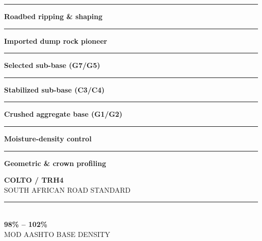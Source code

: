 \begin{minipage}[t]{0.34\textwidth}
    \vspace{0pt}
    \begin{tcolorbox}[
        enhanced, colback=mhoffwhite, colframe=mhnavy, boxrule=1pt, arc=4pt,
        title={\bfseries\color{white}\faRoad\ Layerworks Scope of Work},
        colbacktitle=mhnavy, left=7pt, right=7pt, top=6pt, bottom=6pt,
        drop shadow=black!6
    ]
        \fontsize{8.1pt}{11.6pt}\selectfont
        \textcolor{mhnavy}{\rule{4pt}{4pt}}\hspace{4pt}\textbf{Roadbed ripping \& shaping}\\
        \textcolor{mhnavy}{\rule{4pt}{4pt}}\hspace{4pt}\textbf{Imported dump rock pioneer}\\
        \textcolor{mhnavy}{\rule{4pt}{4pt}}\hspace{4pt}\textbf{Selected sub-base (G7/G5)}\\
        \textcolor{mhnavy}{\rule{4pt}{4pt}}\hspace{4pt}\textbf{Stabilized sub-base (C3/C4)}\\
        \textcolor{mhnavy}{\rule{4pt}{4pt}}\hspace{4pt}\textbf{Crushed aggregate base (G1/G2)}\\
        \textcolor{mhnavy}{\rule{4pt}{4pt}}\hspace{4pt}\textbf{Moisture-density control}\\
        \textcolor{mhnavy}{\rule{4pt}{4pt}}\hspace{4pt}\textbf{Geometric \& crown profiling}
    \end{tcolorbox}

    \vspace{0.20cm}

    \begin{tcolorbox}[
        enhanced, colback=white, colframe=mhlightgray, boxrule=0.8pt, arc=4pt,
        left=6pt, right=6pt, top=6pt, bottom=6pt, halign=center,
        drop shadow=black!4
    ]
        {\fontsize{18pt}{20pt}\selectfont\bfseries\color{mhblue}COLTO / TRH4}\\[1pt]
        {\fontsize{7.4pt}{9pt}\selectfont\color{mhtextmuted}\MakeUppercase{South African Road Standard}}\\[4pt]
        \textcolor{mhlightgray}{\rule{3.2cm}{0.6pt}}\\[4pt]
        {\fontsize{13pt}{15pt}\selectfont\bfseries\color{mhnavy}98\% -- 102\%}\\[1pt]
        {\fontsize{7.2pt}{9pt}\selectfont\color{mhtextmuted}\MakeUppercase{Mod AASHTO Base Density}}
    \end{tcolorbox}
\end{minipage}

